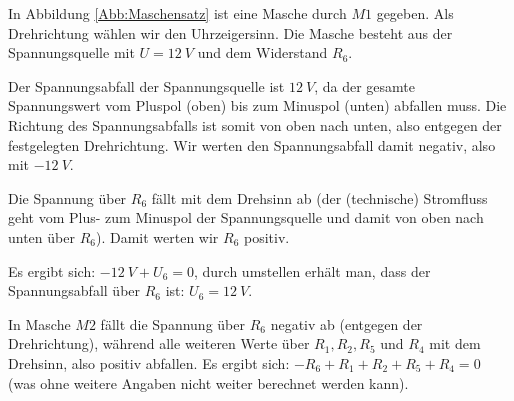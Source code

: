 \begin{Bsp}
In Abbildung \ref{Abb:Maschensatz} ist eine Masche durch $M1$ gegeben.
Als Drehrichtung wählen wir den Uhrzeigersinn.
Die Masche besteht aus der Spannungsquelle mit $U = 12~V$ und dem Widerstand $R_6$.

Der Spannungsabfall der Spannungsquelle ist $12~V$, da der gesamte Spannungswert vom Pluspol (oben) bis zum Minuspol (unten) abfallen muss.
Die Richtung des Spannungsabfalls ist somit von oben nach unten, also entgegen der festgelegten Drehrichtung.
Wir werten den Spannungsabfall damit negativ, also mit $-12~V$.

Die Spannung über $R_6$ fällt mit dem Drehsinn ab (der (technische) Stromfluss geht vom Plus- zum Minuspol der Spannungsquelle und damit von oben nach unten über $R_6$).
Damit werten wir $R_6$ positiv.

Es ergibt sich: $-12~V + U_6 = 0$, durch umstellen erhält man, dass der Spannungsabfall über $R_6$ ist: $U_6 = 12~V$.

In Masche $M2$ fällt die Spannung über $R_6$ negativ ab (entgegen der Drehrichtung), während alle weiteren Werte über $R_1, R_2, R_5$ und $R_4$ mit dem Drehsinn, also positiv abfallen.
Es ergibt sich: $-R_6 + R_1 + R_2 + R_5 + R_4 = 0$ (was ohne weitere Angaben nicht weiter berechnet werden kann).
\end{Bsp}


